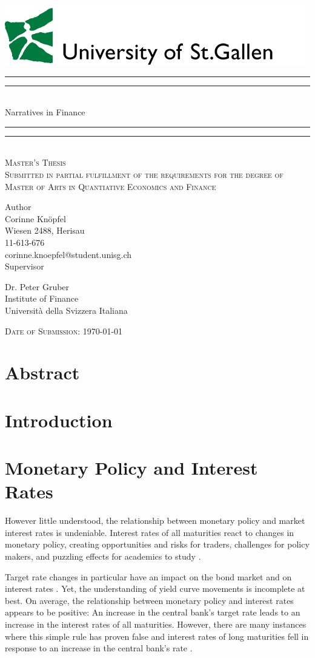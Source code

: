 \documentclass[11pt,a4paper,english,oneside]{book}
\makeatletter
\newcommand*{\plogo}{\includegraphics[scale=0.7]{Images/HSG_logo}}
\numberwithin{equation}{chapter}
\newcommand*{\titleGP}{\begingroup %
\centering %
\vspace*{\baselineskip} %
\plogo\\[2\baselineskip] %
\rule{\textwidth}{1.6pt}\vspace*{-\baselineskip}\vspace*{2pt} %
\rule{\textwidth}{0.4pt}\\[\baselineskip] %
{\LARGE Narratives in Finance }\\[0.2\baselineskip] %
\rule{\textwidth}{0.4pt}\vspace*{-\baselineskip}\vspace{3.2pt} %
\rule{\textwidth}{1.6pt}\\[2\baselineskip] %
\scshape %
Master's Thesis\\[2\baselineskip]
Submitted in partial fulfillment of the requirements for the degree of Master of Arts in Quantiative Economics and Finance \par
\vspace*{2\baselineskip}
Author\\
{\Large Corinne Knöpfel \\ [5pt]
 }
Wiesen 2488, Herisau \\[5pt]
11-613-676\\[5pt]
corinne.knoepfel@student.unisg.ch \\


\vspace*{2\baselineskip}
Supervisor\\
{\Large Dr. Peter Gruber\\[5pt]%
\small Institute of Finance\\[5pt]Universit\`{a} della Svizzera Italiana\par}
\vfill
{\scshape Date of Submission: \today } \\[0.3\baselineskip]
\endgroup}
\makeatother
\begin{document}
\thispagestyle{empty}
\titleGP
\newpage
\doublespacing
\setcounter{page}{1}
\thispagestyle{firststyle}


\chapter*{Abstract}

{\pagestyle{firststyle}
\tableofcontents
\cleardoublepage
}

\listoffigures
\listoftables

\newpage


\chapter{Introduction}
 

\chapter{Monetary Policy and Interest Rates} \label{MonetaryPolicy}
 
\noindent However little understood, the relationship between monetary policy and market interest rates is undeniable. Interest rates of all maturities react to changes in monetary policy, creating opportunities and risks for traders, challenges for policy makers, and puzzling effects for academics to study \citep[p. 1594]{Ellingsen.2001}. 

Target rate changes in particular have an impact on the bond market and on interest rates \citep[p. 332]{Cook.1989}. %
Yet, the understanding of yield curve movements is incomplete at best. On average, the relationship between monetary policy and interest rates appears to be positive: An increase in the central bank's target rate leads to an increase in the interest rates of all maturities. However, there are many instances where this simple rule has proven false and interest rates of long maturities fell in response to an increase in the central bank's rate \citep[p. 1594]{Ellingsen.2001}. 
\end{document}
